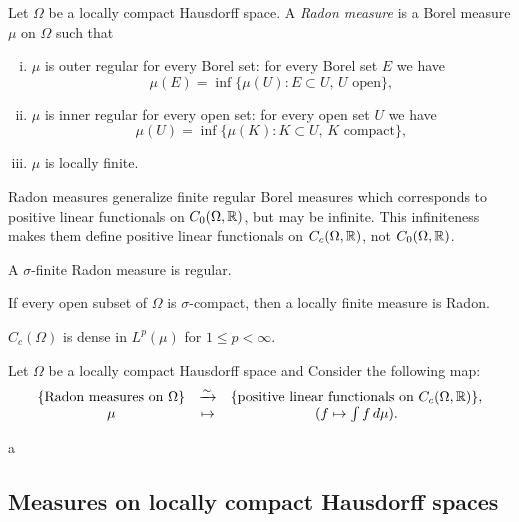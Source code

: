 \documentclass{../../large}
\begin{document}
\begin{prb}
Let $\Omega$ be a locally compact Hausdorff space.
A \emph{Radon measure} is a Borel measure $\mu$ on $\Omega$ such that
\begin{enumerate}[(i)]
\item $\mu$ is outer regular for every Borel set: for every Borel set $E$ we have
\[\mu(E)=\inf\{\mu(U):E\subset U,\,U\text{ open}\},\]
\item $\mu$ is inner regular for every open set: for every open set $U$ we have
\[\mu(U)=\inf\{\mu(K):K\subset U,\,K\text{ compact}\},\]
\item $\mu$ is locally finite.
\end{enumerate}
Radon measures generalize finite regular Borel measures which corresponds to positive linear functionals on $C_0(\Omega,\mathbb{R})$, but may be infinite.
This infiniteness makes them define positive linear functionals on $C_c(\Omega,\mathbb{R})$, not $C_0(\Omega,\mathbb{R})$.
\begin{parts}
\item A $\sigma$-finite Radon measure is regular.
\item If every open subset of $\Omega$ is $\sigma$-compact, then a locally finite measure is Radon.
\item $C_c(\Omega)$ is dense in $L^p(\mu)$ for $1\le p<\infty$.
\end{parts}
\end{prb}

\begin{prb}
Let $\Omega$ be a locally compact Hausdorff space and Consider the following map:
\[\begin{array}{ccc}
\{\text{Radon measures on $\Omega$}\} & \xrightarrow{\sim} & \{\text{positive linear functionals on $C_c(\Omega,\mathbb{R})$}\},\\
\mu & \mapsto & (f\mapsto\int f\,d\mu).
\end{array}\]
\begin{parts}
\item a
\end{parts}
\end{prb}

\begin{prb}
\end{prb}








\subsection{Measures on locally compact Hausdorff spaces}
\end{document}
